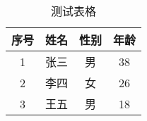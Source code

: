 \documentclass[margin=5pt,
  convert,
  convert={
    outext=.png,
    command=\unexpanded{
      pdftocairo -r 600 -png \infile %
    }
  }
]{standalone}
\begin{document}
  \begin{minipage}{1.8in}
    \begin{table}[!htp]
      \centering
      \caption{测试表格}
      \begin{tabular}{cccc}
        \hline
        序号 & 姓名 & 性别 & 年龄\\\hline
        1 & 张三 & 男 & 38\\\hline
        2 & 李四 & 女 & 26\\\hline
        3 & 王五 & 男 & 18\\\hline
      \end{tabular}    
    \end{table}    
  \end{minipage}
\end{document}
